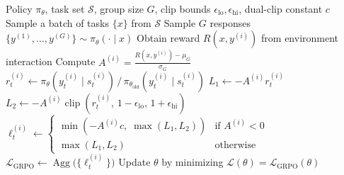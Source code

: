   \begin{algorithm}[t]
  \caption{GRPO}
  \label{alg:grpo}
  \begin{algorithmic}[1]
  \Require Policy $\pi_{\theta}$, task set $\mathcal{S}$, group size $G$, clip
  bounds $\epsilon_{\mathrm{lo}},\epsilon_{\mathrm{hi}}$, dual-clip constant $c$
      \State Sample a batch of tasks $\{x\}$ from $\mathcal{S}$
          \State {}
          \State Sample $G$ responses $\{y^{(1)},\dots,y^{(G)}\} \sim \pi_{\theta}(\cdot \mid
  x)$
          \State {}
              \State Obtain reward $R(x, y^{(i)})$ from environment interaction
          \EndFor
          \State Compute $A^{(i)} = \frac{R(x,y^{(i)}) - \mu_G}{\sigma_G}$
          \State {}
                  \State $r_t^{(i)} \gets \pi_{\theta}(y_t^{(i)} \mid s_t^{(i)}) \,/\,
  \pi_{\theta_{\mathrm{old}}}(y_t^{(i)} \mid s_t^{(i)})$
                  \State $L_1 \gets -A^{(i)} r_t^{(i)}$
                  \State $L_2 \gets -A^{(i)} \operatorname{clip}(r_t^{(i)},\,
  1{-}\epsilon_{\mathrm{lo}},\, 1{+}\epsilon_{\mathrm{hi}})$
                  \State $\ell_t^{(i)} \gets \begin{cases}
  \min(-A^{(i)} c,\;\max(L_1, L_2)) & \text{if } A^{(i)} < 0 \\
  \max(L_1, L_2) & \text{otherwise}
  \end{cases}$
              \EndFor
          \EndFor
          \State $\mathcal{L}_{\mathrm{GRPO}} \gets
  \operatorname{Agg}\!\bigl(\{\ell_t^{(i)}\}\bigr)$
          \State {}
          \State Update $\theta$ by minimizing $\mathcal{L}(\theta) =
  \mathcal{L}_{\mathrm{GRPO}}(\theta)$
      \EndFor
  \EndFor
  \end{algorithmic}
\end{algorithm}

